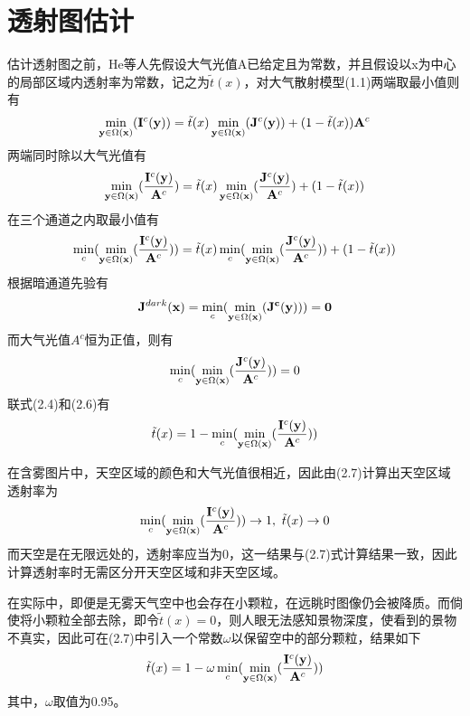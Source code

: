 \documentclass[a4paper, 12pt]{report}
\begin{document}
\section{透射图估计\quad }
估计透射图之前，He等人先假设大气光值A已给定且为常数，并且假设以x为中心的局部区域内透射率为常数，记之为$\tilde{t}(x)$，对大气散射模型(1.1)两端取最小值则有
\begin{equation}
\min_{{\bf y} \in \Omega({\bf x})}({\bf I}^c({\bf y})) = \tilde{t}(x) \min_{{\bf y} \in \Omega({\bf x})}({\bf J}^c({\bf y})) + (1-\tilde{t}(x)){\bf A}^c
\end{equation}
两端同时除以大气光值有
\begin{equation}
\min_{{\bf y} \in \Omega({\bf x})}(\frac{{\bf I}^c({\bf y})}{{\bf A}^c}) = \tilde{t}(x)\min_{{\bf y} \in \Omega({\bf x})}(\frac{{\bf J}^c({\bf y})}{{\bf A}^c}) + (1-\tilde{t}(x))
\end{equation}
在三个通道之内取最小值有
\begin{equation}
\min_c(\min_{{\bf y} \in \Omega({\bf x})}(\frac{{\bf I}^c({\bf y})}{{\bf A}^c})) = \tilde{t}(x)\min_c(\min_{{\bf y} \in \Omega({\bf x})}(\frac{{\bf J}^c({\bf y})}{{\bf A}^c})) + (1-\tilde{t}(x))
\end{equation}
根据暗通道先验有
\begin{equation}
{\bf J}^{dark}{\bf (x)} = \min_c(\min_{{\bf y} \in \Omega({\bf x})}(\bf J^c(y))) = 0
\end{equation}
而大气光值$A^c$恒为正值，则有
\begin{equation}
\min_c(\min_{{\bf y} \in \Omega({\bf x})}(\frac{{\bf J}^c({\bf y})}{{\bf A}^c})) = 0
\end{equation}
联式(2.4)和(2.6)有
\begin{equation}
\tilde{t}(x) = 1 - \min_c(\min_{{\bf y} \in \Omega({\bf x})}(\frac{{\bf I}^c({\bf y})}{{\bf A}^c}))
\end{equation}

在含雾图片中，天空区域的颜色和大气光值很相近，因此由(2.7)计算出天空区域透射率为
$$\min_c(\min_{{\bf y} \in \Omega({\bf x})}(\frac{{\bf I}^c({\bf y})}{{\bf A}^c})) \rightarrow 1,\ \tilde{t}(x) \rightarrow 0$$
而天空是在无限远处的，透射率应当为0，这一结果与(2.7)式计算结果一致，因此计算透射率时无需区分开天空区域和非天空区域。

在实际中，即便是无雾天气空中也会存在小颗粒，在远眺时图像仍会被降质。而倘使将小颗粒全部去除，即令$\tilde{t}(x) = 0$，则人眼无法感知景物深度，使看到的景物不真实，因此可在(2.7)中引入一个常数$\omega$以保留空中的部分颗粒，结果如下
\begin{equation}
\tilde{t}(x) = 1 - \omega\min_c(\min_{{\bf y} \in \Omega({\bf x})}(\frac{{\bf I}^c({\bf y})}{{\bf A}^c}))
\end{equation}
其中，$\omega$取值为0.95。
\end{document}
